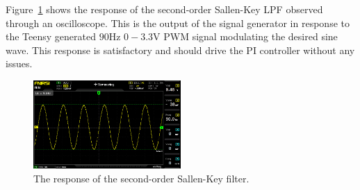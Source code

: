 
Figure~\ref{fig:sallenkey_osc} shows the response of the second-order Sallen-Key
LPF observed through an oscilloscope. This is the output of the signal generator
in response to the Teensy generated $90$\unit{\hertz} $0-3.3$\unit{\volt} PWM
signal modulating the desired sine wave. This response is satisfactory and
should drive the PI controller without any issues.

\begin{figure}[bh]
    \includegraphics[width=0.5\textwidth]{./figures/output_osc.jpg}
    \caption{The response of the second-order Sallen-Key filter.}
    \label{fig:sallenkey_osc}
\end{figure}

